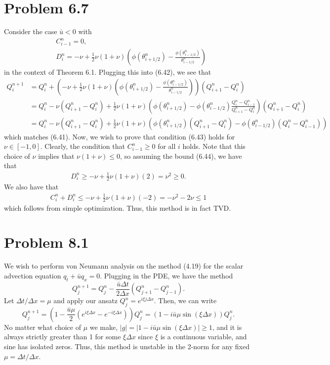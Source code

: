 \documentclass{article}
\begin{document}
\section{Problem 6.7}
Consider the case $\bar u<0$ with 
\begin{align*}
&C^n_{i-1}=0,\\
&D^n_i=-\nu+\frac{1}{2}\nu(1+\nu)\left(\phi(\theta_{i+1/2}^n)-\frac{\phi(\theta_{i-1/2}^n)}{\theta_{i-1/2}^n}\right)
\end{align*}
in the context of Theorem 6.1. Plugging this into (6.42), we see that 
\begin{align*}
Q^{n+1}_i&=Q^n_i+\left(-\nu+\frac{1}{2}\nu(1+\nu)\left(\phi(\theta_{i+1/2}^n)-\frac{\phi(\theta_{i-1/2}^n)}{\theta_{i-1/2}^n}\right)\right)(Q^n_{i+1}-Q^n_i)\\&=
Q^n_i-\nu(Q^n_{i+1}-Q^n_i)+\frac{1}{2}\nu(1+\nu)\left(\phi(\theta_{i+1/2}^n)-\phi(\theta_{i-1/2}^n)\frac{Q^n_{i}-Q^n_{i-1}}{Q^n_{i+1}-Q^n_i}\right)(Q^n_{i+1}-Q^n_i)\\&=
Q^n_i-\nu(Q^n_{i+1}-Q^n_i)+\frac{1}{2}\nu(1+\nu)\left(\phi(\theta_{i+1/2}^n)(Q^n_{i+1}-Q^n_i)-\phi(\theta_{i-1/2}^n)(Q^n_{i}-Q^n_{i-1})\right)
\end{align*}
which matches (6.41). Now, we wish to prove that condition (6.43) holds for $\nu\in[-1,0]$. Clearly, the condition that $C^n_{i-1}\geq0$ for all $i$ holds. Note that this choice of $\nu$ implies that $\nu(1+\nu)\leq0$, so assuming the bound (6.44), we have that
\begin{align*}
D^n_i\geq-\nu+\frac{1}{2}\nu(1+\nu)(2)=\nu^2\geq0.
\end{align*}
We also have that 
\begin{align*}
C^n_i+D^n_i\leq-\nu+\frac{1}{2}\nu(1+\nu)(-2)=-\nu^2-2\nu\leq1
\end{align*}
which follows from simple optimization. Thus, this method is in fact TVD.

\section{Problem 8.1}
We wish to perform von Neumann analysis on the method (4.19) for the scalar advection equation $q_t+\bar uq_x=0$. Plugging in the PDE, we have the method
\[
Q^{n+1}_j=Q^n_j-\frac{\bar u\Delta t}{2\Delta x}(Q^n_{j+1}-Q^n_{j-1}).
\]
Let $\Delta t/\Delta x=\mu$ and apply our ansatz $Q^n_j=e^{i\xi j\Delta x}$. Then, we can write
\[
Q^{n+1}_j=\left(1-\frac{\bar u\mu}{2}\left(e^{i\xi\Delta x}-e^{-i\xi\Delta x}\right)\right)Q^n_j=\left(1-i\bar u\mu\sin(\xi\Delta x)\right)Q^n_j.
\]
No matter what choice of $\mu$ we make, $|g|=|1-i\bar u\mu\sin(\xi\Delta x)|\geq1$, and it is always strictly greater than 1 for some $\xi\Delta x$ since $\xi$ is a continuous variable, and sine has isolated zeros. Thus, this method is unstable in the 2-norm for any fixed $\mu=\Delta t/\Delta x$.
\end{document}
